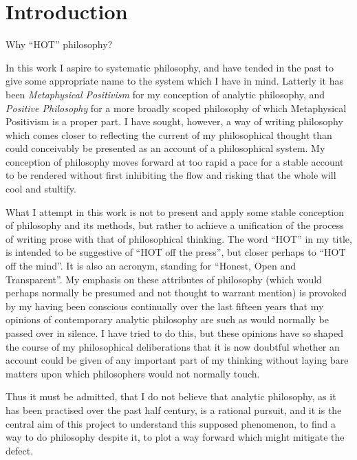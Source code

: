 \def\rbjidintro{$$Id: intro.tex,v 1.1 2010/01/10 21:30:10 rbj Exp $$}
\chapter{Introduction}\label{Introduction}

Why ``HOT'' philosophy?

In this work I aspire to systematic philosophy, and have tended in the past to give some appropriate name to the system which I have in mind.
Latterly it has been {\it Metaphysical Positivism} for my conception of analytic philosophy, and {\it Positive Philosophy} for a more broadly scoped philosophy of which Metaphysical Positivism is a proper part.
I have sought, however, a way of writing philosophy which comes closer to reflecting the current of my philosophical thought than could conceivably be presented as an account of a philosophical system.
My conception of philosophy moves forward at too rapid a pace for a stable account to be rendered without first inhibiting the flow and risking that the whole will cool and stultify.

What I attempt in this work is not to present and apply some stable conception of philosophy and its methods, but rather to achieve a unification of the process of writing prose with that of philosophical thinking.
The word ``HOT'' in my title, is intended to be suggestive of ``HOT off the press'', but closer perhaps to ``HOT off the mind''.
It is also an acronym, standing for ``Honest, Open and Transparent''.
My emphasis on these attributes of philosophy (which would perhaps normally be presumed and not thought to warrant mention) is provoked by my having been conscious continually over the last fifteen years that my opinions of contemporary analytic philosophy are such as would normally be passed over in silence.
I have tried to do this, but these opinions have so shaped the course of my philosophical deliberations that it is now doubtful whether an account could be given of any important part of my thinking without laying bare matters upon which philosophers would not normally touch.

Thus it must be admitted, that I do not believe that analytic philosophy, as it has been practised over the past half century, is a rational pursuit, and it is the central aim of this project to understand this supposed phenomenon, to find a way to do philosophy despite it, to plot a way forward which might mitigate the defect.

